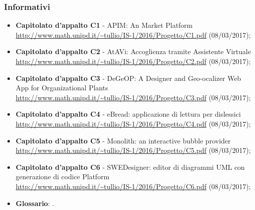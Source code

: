 \documentclass[../StudiodiFattibilita.tex]{subfiles}
\begin{document}
			\subsubsection{Informativi}
			\begin{itemize}
				\item \textbf{Capitolato d'appalto C1} - APIM: An  Market Platform\\
				\url{http://www.math.unipd.it/~tullio/IS-1/2016/Progetto/C1.pdf} (08/03/2017);
				\item \textbf{Capitolato d'appalto C2} - AtAVi: Accoglienza tramite Assistente Virtuale\\
				\url{http://www.math.unipd.it/~tullio/IS-1/2016/Progetto/C2.pdf} (08/03/2017);
				\item \textbf{Capitolato d'appalto C3} - DeGeOP: A Designer and Geo-ocalizer Web App for Organizational Plants\\ 
				\url{http://www.math.unipd.it/~tullio/IS-1/2016/Progetto/C3.pdf} (08/03/2017);
				\item \textbf{Capitolato d'appalto C4} - eBread: applicazione di lettura per dislessici \\
				\url{http://www.math.unipd.it/~tullio/IS-1/2016/Progetto/C4.pdf} (08/03/2017);
				\item \textbf{Capitolato d'appalto C5} - Monolith: an interactive bubble provider\\
				\url{http://www.math.unipd.it/~tullio/IS-1/2016/Progetto/C5.pdf} (08/03/2017);
				\item \textbf{Capitolato d'appalto C6} - SWEDesigner: editor di diagrammi UML con generazione di codice Platform\\
				\url{http://www.math.unipd.it/~tullio/IS-1/2016/Progetto/C6.pdf} (08/03/2017);
				\item \textbf{Glossario}: \glossariov.
			\end{itemize}
\end{document}
